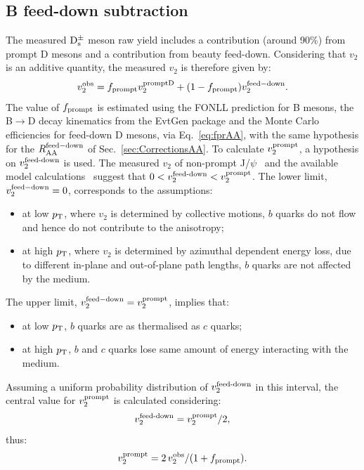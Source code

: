 \subsection{B feed-down subtraction}
\label{sec:FDv2}
The measured ${\rm D_s^{\pm}}$ meson raw yield includes a contribution (around 90\%)
from prompt D mesons and a contribution from beauty feed-down.
Considering that $v_2$ is an additive quantity, the measured $v_2$ is therefore given by:
\begin{equation}
\label{eq:bfeed}
v_2^{\rm obs}=f_{\rm prompt} v_2^{\rm promptD} + (1-f_{\rm prompt})v_2^{\rm feed-down}.
\end{equation}
The value of $f_{\rm prompt}$ is estimated using the FONLL prediction for B mesons, 
the B$\rightarrow$D decay kinematics from the EvtGen package and
the Monte Carlo efficiencies for feed-down D mesons, via Eq.~\ref{eq:fprAA},
with the same hypothesis for the $R_{\rm AA}^{\rm feed-down}$ of 
Sec.~\ref{sec:CorrectionsAA}.
To calculate $v_{\rm 2}^{\rm prompt}$, a hypothesis on 
$v_{\rm 2}^{\rm feed\textnormal{-}down}$ is used.
The measured $v_2$ of non-prompt J/$\psi$~\cite{Khachatryan:2016ypw} 
and the available model calculations~\cite{Aichelin:2012ww,Uphoff:2012gb,Greco:2007sz} 
suggest that $0<v_{\rm 2}^{\rm feed\textnormal{-}down}<v_{\rm 2}^{\rm prompt}$.
The lower limit, $v_2^{\rm feed-down}=0$, corresponds to the assumptions:
\begin{itemize}
\item{at low $p_{\rm T}$, where $v_2$ is determined by collective motions, 
$b$ quarks do not flow and hence do not contribute to the anisotropy;}
\item{at high $p_{\rm T}$, where $v_2$ is determined by azimuthal dependent 
energy loss, due to different in-plane and out-of-plane path lengths, 
$b$ quarks are not affected by the medium.}
\end{itemize}
The upper limit, $v_2^{\rm feed-down}=v_2^{\rm prompt}$, implies that:
\begin{itemize}
\item{at low $p_{\rm T}$, $b$ quarks are as thermalised as $c$ quarks;}
\item{at high $p_{\rm T}$, $b$ and $c$ quarks lose same amount of energy interacting with the medium.}
\end{itemize}
Assuming a uniform probability distribution of $v_{\rm 2}^{\rm feed\textnormal{-}down}$ in this interval,
the central value for $v_{\rm 2}^{\rm prompt}$ is calculated 
considering:
\begin{equation}
\label{eq:hypoFD}
v_{\rm 2}^{\rm feed\textnormal{-}down}=v_{\rm 2}^{\rm prompt}/2,
\end{equation}
thus:
\begin{equation}
\label{eq:finalv2}
v_{\rm 2}^{\rm prompt}= 2\,v_{\rm 2}^{\rm obs}/(1+f_{\rm prompt}).
\end{equation}

